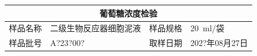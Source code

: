 \documentclass[UTF8,10pt,a4paper,fontset=fandol]{ctexart}
\newcommand{\fieldvalue}[1]{#1}
\newcommand{\handwritten}[1]{#1}
\begin{document}
\begin{center}
\begin{tabular}{|p{}|p{}|p{}|p{}|}
\hline
\multicolumn{4}{|c|}{葡萄糖浓度检验} \\
\hline
样品名称 &
\fieldvalue{二级生物反应器细胞泥液} &
样品规格 &
\fieldvalue{\handwritten{20}~ml/袋} \\
\hline
样品批号 &
\fieldvalue{\handwritten{A?23?00?}} &
取样日期 &
\fieldvalue{\handwritten{202?年08月27日}} \\
\hline
\end{tabular}
\end{center}
\end{document}
